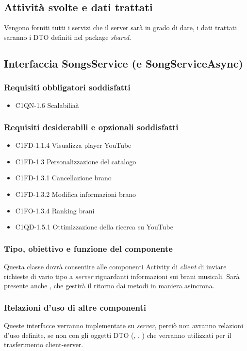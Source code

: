 \subsection*{Attivit\`a svolte e dati trattati}
Vengono forniti tutti i servizi che il server sar\`a in grado di dare, i dati
trattati saranno i DTO definiti nel package \emph{shared}.

\subsection{Interfaccia SongsService (e SongServiceAsync)}
\subsubsection*{Requisiti obbligatori soddisfatti}
\begin{itemize}
	\item C1QN-1.6 Scalabilia\`a
\end{itemize}
\subsubsection*{Requisiti desiderabili e opzionali soddisfatti}
\begin{itemize}
    \item C1FD-1.1.4 Visualizza player YouTube
    \item C1FD-1.3 Personalizzazione del catalogo
    \item C1FD-1.3.1 Cancellazione brano
    \item C1FD-1.3.2 Modifica informazioni brano
    \item C1FO-1.3.4 Ranking brani
    \item C1QD-1.5.1 Ottimizzazione della ricerca su YouTube
\end{itemize}
\subsubsection*{Tipo, obiettivo e funzione del componente}
Questa classe dovr\`a consentire alle componenti Activity di \emph{client} di
inviare richieste di vario tipo a \emph{server} riguardanti informazioni sui
brani musicali. Sar\`a presente anche , che gestir\`a il ritorno
dai metodi in maniera asincrona.
\subsubsection*{Relazioni d'uso di altre componenti}
Queste interfacce verranno implementate su \emph{server}, perci\`o non
avranno relazioni d'uso definite, se non con gli oggetti DTO
(, , ) che verranno
utilizzati per il trasferimento client-server.
